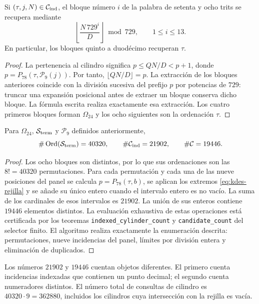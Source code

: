 \begin{lemma}
Si $(\tau,j,N)\in\mathcal C_{\rm ind}$, el bloque número $i$ de la
palabra de setenta y ocho trits se recupera mediante
\[
 \left\lfloor\frac{N\,729^i}{D}\right\rfloor\bmod729,
 \qquad1\leq i\leq13.
\]
En particular, los bloques quinto a duodécimo recuperan $\tau$.
\end{lemma}
\begin{proof}
La pertenencia al cilindro significa
$p\leq QN/D<p+1$, donde $p=P_{78}(\tau,\mathcal P_9(j))$.
Por tanto, $\lfloor QN/D\rfloor=p$. La extracción de los bloques
anteriores coincide con la división sucesiva del prefijo $p$ por
potencias de $729$: truncar una expansión posicional antes de extraer
un bloque conserva dicho bloque. La fórmula escrita realiza
exactamente esa extracción. Los cuatro primeros bloques forman
$\Omega_{24}$ y los ocho siguientes son la ordenación $\tau$.
\end{proof}

\begin{proposition}
Para $\Omega_{24}$, $\mathcal S_{\rm term}$ y $\mathcal P_9$
definidos anteriormente,
\[
 \#\operatorname{Ord}(\mathcal S_{\rm term})=40320,
 \qquad\#\mathcal C_{\rm ind}=21902,
 \qquad\#\mathcal C=19446.
\]
\end{proposition}
\begin{proof}
Los ocho bloques son distintos, por lo que sus ordenaciones son las
$8!=40320$ permutaciones. Para cada permutación y cada una de las
nueve posiciones del panel se calcula $p=P_{78}(\tau,b)$, se aplican
los extremos \eqref{eq:kdes-rejilla} y se añade su único entero cuando
el intervalo entero es no vacío. La suma de los cardinales de esos
intervalos es $21902$. La unión de sus enteros contiene $19446$
elementos distintos. La evaluación exhaustiva de estas operaciones
está certificada por los teoremas
\texttt{indexed\_cylinder\_count} y \texttt{candidate\_count} del
selector finito. El algoritmo realiza exactamente la enumeración
descrita: permutaciones, nueve incidencias del panel, límites por
división entera y eliminación de duplicados.
\end{proof}

Los números $21902$ y $19446$ cuentan objetos diferentes. El primero
cuenta incidencias indexadas que contienen un punto decimal; el segundo
cuenta numeradores distintos. El número total de consultas de cilindro
es $40320\cdot9=362880$, incluidos los cilindros cuya intersección con
la rejilla es vacía.


